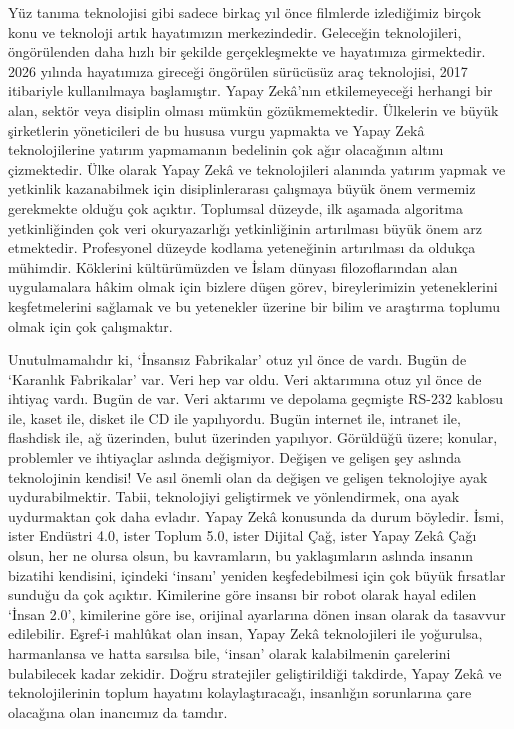 \documentclass{article}
\begin{document}
\begin{multicols}{2}
Yüz tanıma teknolojisi gibi sadece birkaç yıl önce filmlerde izlediğimiz birçok
konu ve teknoloji artık hayatımızın merkezindedir. Geleceğin teknolojileri, öngörülenden daha hızlı bir şekilde gerçekleşmekte ve hayatımıza girmektedir.
2026 yılında hayatımıza gireceği öngörülen sürücüsüz araç teknolojisi, 2017
itibariyle kullanılmaya başlamıştır. Yapay Zekâ’nın etkilemeyeceği herhangi bir
alan, sektör veya disiplin olması mümkün gözükmemektedir. Ülkelerin ve büyük
şirketlerin yöneticileri de bu hususa vurgu yapmakta ve Yapay Zekâ teknolojilerine yatırım yapmamanın bedelinin çok ağır olacağının altını çizmektedir.
Ülke olarak Yapay Zekâ ve teknolojileri alanında yatırım yapmak ve yetkinlik
kazanabilmek için disiplinlerarası çalışmaya büyük önem vermemiz gerekmekte
olduğu çok açıktır. Toplumsal düzeyde, ilk aşamada algoritma yetkinliğinden
çok veri okuryazarlığı yetkinliğinin artırılması büyük önem arz etmektedir. Profesyonel düzeyde kodlama yeteneğinin artırılması da oldukça mühimdir. Köklerini kültürümüzden ve İslam dünyası filozoflarından alan uygulamalara hâkim
olmak için bizlere düşen görev, bireylerimizin yeteneklerini keşfetmelerini sağlamak ve bu yetenekler üzerine bir bilim ve araştırma toplumu olmak için çok
çalışmaktır.


\newpage
Unutulmamalıdır ki, ‘İnsansız Fabrikalar’ otuz yıl önce de vardı. Bugün de ‘Karanlık Fabrikalar’ var. Veri hep var oldu. Veri aktarımına otuz yıl önce de ihtiyaç
vardı. Bugün de var. Veri aktarımı ve depolama geçmişte RS-232 kablosu ile, kaset ile, disket ile CD ile yapılıyordu. Bugün internet ile, intranet ile, flashdisk ile,
ağ üzerinden, bulut üzerinden yapılıyor. Görüldüğü üzere; konular, problemler
ve ihtiyaçlar aslında değişmiyor. Değişen ve gelişen şey aslında teknolojinin kendisi! Ve asıl önemli olan da değişen ve gelişen teknolojiye ayak uydurabilmektir.
Tabii, teknolojiyi geliştirmek ve yönlendirmek, ona ayak uydurmaktan çok daha
evladır. Yapay Zekâ konusunda da durum böyledir. İsmi, ister Endüstri 4.0, ister
Toplum 5.0, ister Dijital Çağ, ister Yapay Zekâ Çağı olsun, her ne olursa olsun, bu kavramların, bu yaklaşımların aslında insanın bizatihi kendisini, içindeki
‘insanı’ yeniden keşfedebilmesi için çok büyük fırsatlar sunduğu da çok açıktır.
Kimilerine göre insansı bir robot olarak hayal edilen ‘İnsan 2.0’, kimilerine göre
ise, orijinal ayarlarına dönen insan olarak da tasavvur edilebilir. Eşref-i mahlûkat olan insan, Yapay Zekâ teknolojileri ile yoğurulsa, harmanlansa ve hatta sarsılsa bile, ‘insan’ olarak kalabilmenin çarelerini bulabilecek kadar zekidir. Doğru
stratejiler geliştirildiği takdirde, Yapay Zekâ ve teknolojilerinin toplum hayatını
kolaylaştıracağı, insanlığın sorunlarına çare olacağına olan inancımız da tamdır. 
    
\end{multicols}
\end{document}
